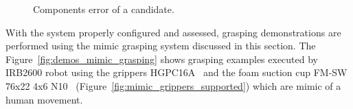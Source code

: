 \begin{figure}[h!]
{\begin{tcolorbox}
\begin{subfigure}[c]{.485\textwidth}
     \end{subfigure}
    \end{tcolorbox}
    \caption{Components error of a candidate.}
    \label{fig:mimic_grapsing_final_error}
  }%
\end{figure}


With the system properly configured and assessed, grasping demonstrations are performed using the mimic grasping system discussed in this section. The Figure~\ref{fig:demos_mimic_grasping} shows grasping examples executed by IRB2600 robot using the grippers HGPC16A~\cite{festo_2f} and the foam suction cup FM-SW 76x22 4x6 N10~\cite{schmalz_cup} (Figure~\ref{fig:mimic_grippers_supported}) which are mimic of a human movement.





